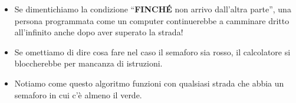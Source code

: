 \begin{attenzione}
\begin{itemize}
  \item Se dimentichiamo la condizione ``\textbf{FINCHÉ} non arrivo dall'altra parte'', una persona programmata come un computer continuerebbe a camminare dritto all'infinito anche dopo aver superato la strada!
  \item Se omettiamo di dire cosa fare nel caso il semaforo sia rosso, il calcolatore si bloccherebbe per mancanza di istruzioni.
  \item Notiamo come questo algoritmo funzioni con qualsiasi strada che abbia un semaforo in cui c'è almeno il verde.
\end{itemize}
\end{attenzione}


